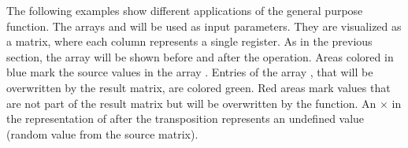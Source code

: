 The following examples show different applications of the general purpose  function.
The arrays  and  will be used as input parameters. 
They are visualized as a matrix, where each column represents a single register.
As in the previous section, the array  will be shown before and after the operation.
Areas colored in blue mark the source values in the array .
Entries of the array , that will be overwritten by the result matrix, are colored green.
Red areas mark values that are not part of the result matrix but will be overwritten by the function.
An $\times$ in the representation of  after the transposition represents an undefined value (random value from the source matrix).

